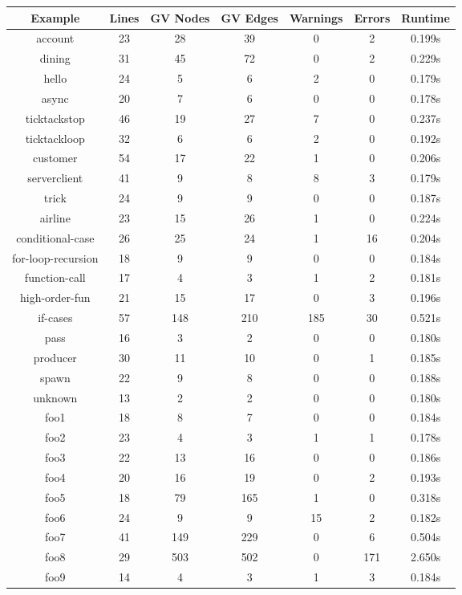 \begin{table}[h]
\centering
\begin{tabular}{|c|c|c|c|c|c|c|}
\hline
Example & Lines & GV Nodes & GV Edges & Warnings & Errors & Runtime \\ 
\hline
account & 23 & 28 & 39 & 0 & 2 & 0.199s \\ 
dining & 31 & 45 & 72 & 0 & 2 & 0.229s \\ 
hello & 24 & 5 & 6 & 2 & 0 & 0.179s \\ 
async & 20 & 7 & 6 & 0 & 0 & 0.178s \\ 
ticktackstop & 46 & 19 & 27 & 7 & 0 & 0.237s \\ 
ticktackloop & 32 & 6 & 6 & 2 & 0 & 0.192s \\ 
customer & 54 & 17 & 22 & 1 & 0 & 0.206s \\ 
serverclient & 41 & 9 & 8 & 8 & 3 & 0.179s \\ 
trick & 24 & 9 & 9 & 0 & 0 & 0.187s \\ 
airline & 23 & 15 & 26 & 1 & 0 & 0.224s \\ 
conditional-case & 26 & 25 & 24 & 1 & 16 & 0.204s \\ 
for-loop-recursion & 18 & 9 & 9 & 0 & 0 & 0.184s \\ 
function-call & 17 & 4 & 3 & 1 & 2 & 0.181s \\ 
high-order-fun & 21 & 15 & 17 & 0 & 3 & 0.196s \\ 
if-cases & 57 & 148 & 210 & 185 & 30 & 0.521s \\ 
pass & 16 & 3 & 2 & 0 & 0 & 0.180s \\ 
producer & 30 & 11 & 10 & 0 & 1 & 0.185s \\ 
spawn & 22 & 9 & 8 & 0 & 0 & 0.188s \\ 
unknown & 13 & 2 & 2 & 0 & 0 & 0.180s \\ 
foo1 & 18 & 8 & 7 & 0 & 0 & 0.184s \\ 
foo2 & 23 & 4 & 3 & 1 & 1 & 0.178s \\ 
foo3 & 22 & 13 & 16 & 0 & 0 & 0.186s \\ 
foo4 & 20 & 16 & 19 & 0 & 2 & 0.193s \\ 
foo5 & 18 & 79 & 165 & 1 & 0 & 0.318s \\ 
foo6 & 24 & 9 & 9 & 15 & 2 & 0.182s \\ 
foo7 & 41 & 149 & 229 & 0 & 6 & 0.504s \\ 
foo8 & 29 & 503 & 502 & 0 & 171 & 2.650s \\ 
foo9 & 14 & 4 & 3 & 1 & 3 & 0.184s \\ 

\end{tabular}
\end{table}

